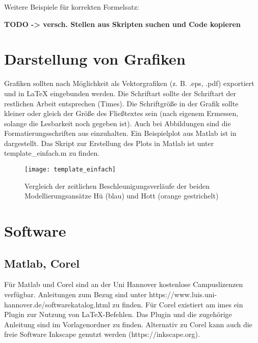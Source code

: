 Weitere Beispiele für korrekten Formelsatz:

\textbf{TODO -> versch. Stellen aus Skripten suchen und Code kopieren}


\section{Darstellung von Grafiken}

Grafiken sollten nach Möglichkeit als Vektorgrafiken (z. B. .eps, .pdf) exportiert und in LaTeX eingebunden werden. Die Schriftart sollte der Schriftart der restlichen Arbeit entsprechen (Times). Die Schriftgröße in der Grafik sollte kleiner oder gleich der Größe des Fließtextes sein (nach eigenem Ermessen, solange die Lesbarkeit noch gegeben ist). Auch bei Abbildungen sind die Formatierungsschriften aus  einzuhalten. Ein Beispielplot aus Matlab ist in  dargestellt. Das Skript zur Erstellung des Plots in Matlab ist unter template\_einfach.m zu finden.

\begin{figure}[!ht]
	\begin{center}
		\texttt{[image: template\_einfach]}
		\caption{Vergleich der zeitlichen Beschleunigungsverläufe der beiden Modellierungsansätze Hü (blau) und Hott (orange gestrichelt)}
		\label{fig.Template}
	\end{center}
\end{figure}


\section{Software}
\subsection{Matlab, Corel}
Für Matlab und Corel sind an der Uni Hannover kostenlose Campuslizenzen verfügbar. Anleitungen zum Bezug sind unter https://www.luis.uni-hannover.de/softwarekatalog.html zu finden. Für Corel existiert am imes ein Plugin zur Nutzung von LaTeX-Befehlen. Das Plugin und die zugehörige Anleitung sind im Vorlagenordner zu finden. Alternativ zu Corel kann auch die freie Software Inkscape genutzt werden (https://inkscape.org).

